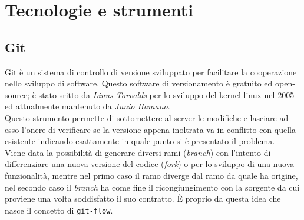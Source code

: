 \section{Tecnologie e strumenti}
\subsection{Git}

Git è un sistema di controllo di versione sviluppato per facilitare la cooperazione nello sviluppo di software. Questo software di versionamento è gratuito ed open-source;  è stato sritto  da \textit{Linus Torvalds} per lo sviluppo del kernel linux nel 2005 ed attualmente mantenuto da \textit{Junio Hamano}. \\
Questo strumento permette di sottomettere al server le modifiche e lasciare ad esso l'onere di verificare se la versione appena inoltrata va in conflitto con quella esistente indicando esattamente in quale punto si è presentato il problema. \\
Viene data la possibilità di generare diversi rami (\textit{branch}) con l'intento di differenziare una nuova versione del codice (\textit{fork}) o per lo sviluppo di una nuova funzionalità, mentre nel primo caso il ramo diverge dal ramo da quale ha origine, nel secondo caso il \textit{branch} ha come fine il ricongiungimento con la sorgente da cui proviene una volta soddisfatto il suo contratto. È proprio da questa idea che nasce il concetto di \texttt{git-flow}.

